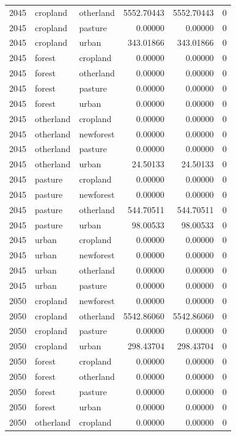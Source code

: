 \documentclass[
]{article}
\begin{document}
\begin{longtable}[]{@{}rllrrr@{}}
2045 & cropland & otherland & 5552.70443 & 5552.70443 & 0 \\
2045 & cropland & pasture & 0.00000 & 0.00000 & 0 \\
2045 & cropland & urban & 343.01866 & 343.01866 & 0 \\
2045 & forest & cropland & 0.00000 & 0.00000 & 0 \\
2045 & forest & otherland & 0.00000 & 0.00000 & 0 \\
2045 & forest & pasture & 0.00000 & 0.00000 & 0 \\
2045 & forest & urban & 0.00000 & 0.00000 & 0 \\
2045 & otherland & cropland & 0.00000 & 0.00000 & 0 \\
2045 & otherland & newforest & 0.00000 & 0.00000 & 0 \\
2045 & otherland & pasture & 0.00000 & 0.00000 & 0 \\
2045 & otherland & urban & 24.50133 & 24.50133 & 0 \\
2045 & pasture & cropland & 0.00000 & 0.00000 & 0 \\
2045 & pasture & newforest & 0.00000 & 0.00000 & 0 \\
2045 & pasture & otherland & 544.70511 & 544.70511 & 0 \\
2045 & pasture & urban & 98.00533 & 98.00533 & 0 \\
2045 & urban & cropland & 0.00000 & 0.00000 & 0 \\
2045 & urban & newforest & 0.00000 & 0.00000 & 0 \\
2045 & urban & otherland & 0.00000 & 0.00000 & 0 \\
2045 & urban & pasture & 0.00000 & 0.00000 & 0 \\
2050 & cropland & newforest & 0.00000 & 0.00000 & 0 \\
2050 & cropland & otherland & 5542.86060 & 5542.86060 & 0 \\
2050 & cropland & pasture & 0.00000 & 0.00000 & 0 \\
2050 & cropland & urban & 298.43704 & 298.43704 & 0 \\
2050 & forest & cropland & 0.00000 & 0.00000 & 0 \\
2050 & forest & otherland & 0.00000 & 0.00000 & 0 \\
2050 & forest & pasture & 0.00000 & 0.00000 & 0 \\
2050 & forest & urban & 0.00000 & 0.00000 & 0 \\
2050 & otherland & cropland & 0.00000 & 0.00000 & 0 \\

\end{longtable}
\end{document}
